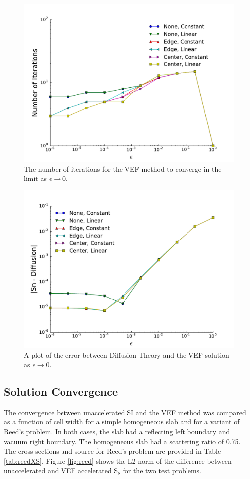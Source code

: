 	\begin{figure} \centering
		\includegraphics[width=.75\textwidth]{figs/diffLimit.pdf}
		\caption{The number of iterations for the VEF method to converge in the limit as $\epsilon \rightarrow 0$.}
		\label{fig:diffLim_iterations}
	\end{figure}
	\begin{figure} \centering
		\includegraphics[width=.75\textwidth]{figs/diffError.pdf}
		\caption{A plot of the error between Diffusion Theory and the VEF solution as $\epsilon\rightarrow 0$. }
		\label{fig:diffLim_error}
	\end{figure}

\subsection{Solution Convergence}
The convergence between unaccelerated SI and the VEF method was compared as a function of cell width for a simple homogeneous slab and for a variant of Reed's problem. In both cases, the slab had a reflecting left boundary and vacuum right boundary. The homogeneous slab had a scattering ratio of 0.75. The cross sections and source for Reed's problem are provided in Table \ref{tab:reedXS}. Figure \ref{fig:reed} shows the L2 norm of the difference between unaccelerated and VEF accelerated S$_8$ for the two test problems. 

